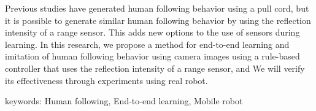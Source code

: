   Previous studies have generated human following behavior using a pull cord, but it is possible to generate similar human following behavior by using the reflection intensity of a range sensor. This adds new options to the use of sensors during learning. In this research, we propose a method for end-to-end learning and imitation of human following behavior using camera images using a rule-based controller that uses the reflection intensity of a range sensor, and We will verify its effectiveness through experiments using real robot.

  \vspace{1.5zh}

  keywords: Human following, End-to-end learning, Mobile robot
